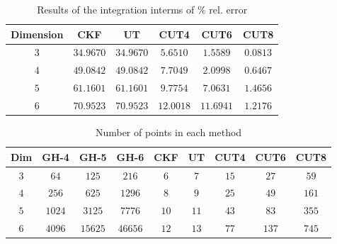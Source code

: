 \documentclass[11pt]{beamer}
\begin{document}
\begin{frame}
\begin{table}
\caption{Results of the integration interms of \% rel. error }
\label{optsoln12}
\begin{center}

\begin{tabular}{|c||c|c|c|c|c|}
\hline
Dimension & CKF & UT & CUT4 & CUT6 & CUT8 \\
\hline
$3$ & $34.9670 $  &  $34.9670$ & $5.6510$ & $1.5589$ & $0.0813$  \\
\hline
$4$ & $49.0842 $  &  $49.0842 $ &  $7.7049$ &  $2.0998 $ & $0.6467$\\
\hline
$5$ & $61.1601 $  &  $61.1601 $ &  $9.7754$ & $7.0631 $ & $1.4656$\\
\hline
$6$ & $70.9523$  &  $70.9523 $ & $12.0018$ & $11.6941$ & $1.2176$\\
\hline
\end{tabular}
\end{center}
\end{table}

\begin{table}
\caption{Number of points in each method }
\label{optsoln12}
\begin{center}
\small
\begin{tabular}{|c||c|c|c|c|c|c|c|c|}
\hline
Dim    &  GH-4  & GH-5     &  GH-6         & CKF   & UT    & CUT4  & CUT6  & CUT8 \\
\hline
$3$    & $64$  & $125 $   &  $216$    &      $6$   & $7$   & $15$   & $27$   & $59$\\
\hline
$4$    & $256$  & $625 $  &  $1296$   &   $8$   & $9$   & $25$   & $49$   & $161$\\
\hline
$5$   &  $1024$  & $3125 $  &  $7776 $ &   $10$  & $11$  & $43$   & $83$   & $355$\\
\hline
$6$    & $4096$  & $15625$   &  $46656$  &   $12$  & $13$  & $77$   & $137$   & $745$\\
\hline
\end{tabular}
\end{center}
\end{table}
\end{frame}

\end{document}

